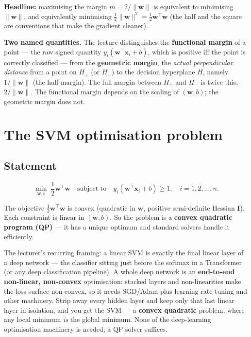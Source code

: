 \documentclass[11pt, a4paper]{article}
\begin{document}
\textbf{Headline:} maximising the margin $m = 2/\|\mathbf{w}\|$ is equivalent to minimising $\|\mathbf{w}\|$, and equivalently minimising $\tfrac{1}{2}\|\mathbf{w}\|^2 = \tfrac{1}{2}\mathbf{w}^\top\mathbf{w}$ (the half and the square are conventions that make the gradient cleaner).

\textbf{Two named quantities.} The lecture distinguishes the \textbf{functional margin} of a point — the raw signed quantity $y_i(\mathbf{w}^\top\mathbf{x}_i + b)$, which is positive iff the point is correctly classified — from the \textbf{geometric margin}, the \emph{actual perpendicular distance} from a point on $H_+$ (or $H_-$) to the decision hyperplane $H$, namely $1/\|\mathbf{w}\|$ (the half-margin). The full margin between $H_+$ and $H_-$ is twice this, $2/\|\mathbf{w}\|$. The functional margin depends on the scaling of $(\mathbf{w}, b)$; the geometric margin does not.

\section{The SVM optimisation problem}

\subsection{Statement}

\begin{defbox}
\[
\min_{\mathbf{w}, b}\;\frac{1}{2}\mathbf{w}^\top\mathbf{w}
\quad
\text{subject to}\quad
y_i(\mathbf{w}^\top\mathbf{x}_i + b) \ge 1, \quad i = 1, 2, \ldots, n.
\]
\end{defbox}

The objective $\tfrac{1}{2}\mathbf{w}^\top\mathbf{w}$ is convex (quadratic in $\mathbf{w}$, positive semi-definite Hessian $\mathbf{I}$). Each constraint is linear in $(\mathbf{w}, b)$. So the problem is a \textbf{convex quadratic program (QP)} — it has a unique optimum and standard solvers handle it efficiently.

\begin{notebox}
The lecturer's recurring framing: a linear SVM is exactly the final linear layer of a deep network — the classifier sitting just before the softmax in a Transformer (or any deep classification pipeline). A whole deep network is an \textbf{end-to-end non-linear, non-convex} optimisation: stacked layers and non-linearities make the loss surface non-convex, so it needs SGD/Adam plus learning-rate tuning and other machinery. Strip away every hidden layer and keep only that last linear layer in isolation, and you get the SVM — a \textbf{convex quadratic} problem, where any local minimum \emph{is} the global minimum. None of the deep-learning optimisation machinery is needed; a QP solver suffices.
\end{notebox}
\end{document}
